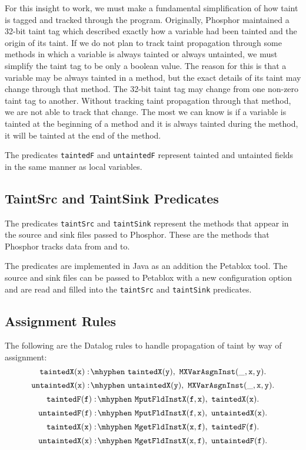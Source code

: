 For this insight to work, we must make a fundamental simplification of
how taint is tagged and tracked through the program. Originally,
Phosphor maintained a 32-bit taint tag which described exactly how a
variable had been tainted and the origin of its taint. If we do not
plan to track taint propagation through some methods in which a
variable is always tainted or always untainted, we must simplify the
taint tag to be only a boolean value. The reason for this is that a
variable may be always tainted in a method, but the exact details of
its taint may change through that method. The 32-bit taint tag may
change from one non-zero taint tag to another. Without tracking taint
propagation through that method, we are not able to track that
change. The most we can know is if a variable is tainted at the
beginning of a method and it is always tainted during the method, it
will be tainted at the end of the method.

The predicates \texttt{taintedF} and \texttt{untaintedF} represent
tainted and untainted fields in the same manner as local variables.
\subsection{TaintSrc and TaintSink Predicates}
The predicates \texttt{taintSrc} and \texttt{taintSink} represent the
methods that appear in the source and sink files passed to
Phosphor. These are the methods that Phosphor tracks data from and to.

The predicates are implemented in Java as an addition the Petablox
tool. The source and sink files can be passed to Petablox with a new
configuration option and are read and filled into the
\texttt{taintSrc} and \texttt{taintSink} predicates.
\subsection{Assignment Rules}
The following are the Datalog rules to handle propagation of taint by
way of assignment:
\begin{equation}
  \mathtt{taintedX(x) \is taintedX(y) \also MXVarAsgnInst(\_,x,y).}
\end{equation}
\begin{equation}
  \mathtt{untaintedX(x) \is untaintedX(y) \also
    MXVarAsgnInst(\_,x,y).}
\end{equation}
\begin{equation}
  \mathtt{taintedF(f) \is MputFldInstX(f,x) \also taintedX(x).}
\end{equation}
\begin{equation}
  \mathtt{untaintedF(f) \is MputFldInstX(f,x) \also untaintedX(x).}
\end{equation}
\begin{equation}
  \mathtt{taintedX(x) \is MgetFldInstX(x,f) \also taintedF(f).}
\end{equation}
\begin{equation}
  \mathtt{untaintedX(x) \is MgetFldInstX(x,f) \also untaintedF(f).}
\end{equation}

